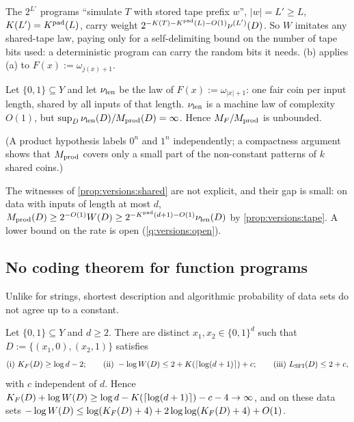The $2^{L'}$ programs ``simulate $T$ with stored tape prefix $w$'', $|w|=L'\ge L$, $K(L')=K^{\mathrm{pad}}(L)$, carry weight $2^{-K(T)-K^{\mathrm{pad}}(L)-O(1)}\nu^{(L')}(D)$. So $W$ imitates any shared-tape law, paying only for a self-delimiting bound on the number of tape bits used: a deterministic program can carry the random bits it needs. (b) applies (a) to $F(x):=\omega_{j(x)+1}$.

\begin{proposition}\label{prop:versions:shared}
Let $\{0,1\}\subseteq Y$ and let $\nu_{\mathrm{len}}$ be the law of $F(x):=\omega_{|x|+1}$: one fair coin per input length, shared by all inputs of that length. $\nu_{\mathrm{len}}$ is a machine law of complexity $O(1)$, but $\sup_D\nu_{\mathrm{len}}(D)/M_{\mathrm{prod}}(D)=\infty$. Hence $M_{F}/M_{\mathrm{prod}}$ is unbounded.
\end{proposition}

(A product hypothesis labels $0^n$ and $1^n$ independently; a compactness argument shows that $M_{\mathrm{prod}}$ covers only a small part of the non-constant patterns of $k$ shared coins.)

\begin{remark}\label{rem:versions:sharedsize}
The witnesses of \cref{prop:versions:shared} are not explicit, and their gap is small: on data with inputs of length at most $d$, $M_{\mathrm{prod}}(D)\ge2^{-O(1)}W(D)\ge2^{-K^{\mathrm{pad}}(d+1)-O(1)}\nu_{\mathrm{len}}(D)$ by \cref{prop:versions:tape}. A lower bound on the rate is open (\cref{q:versions:open}).
\end{remark}

\subsection{No coding theorem for function programs}\label{sec:versions:coding}

Unlike for strings, shortest description and algorithmic probability of data sets do not agree up to a constant.

\begin{theorem}\label{thm:versions:nocoding}
Let $\{0,1\}\subseteq Y$ and $d\ge2$. There are distinct $x_1,x_2\in\{0,1\}^d$ such that $D:=\{(x_1,0),(x_2,1)\}$ satisfies
\[
\text{(i) }K_{F}(D)\ge\log d-2;\qquad\text{(ii) }-\log W(D)\le2+K(\lceil\log(d+1)\rceil)+c;\qquad\text{(iii) }L_{\mathrm{SFI}}(D)\le2+c,
\]
with $c$ independent of $d$. Hence $K_{F}(D)+\log W(D)\ge\log d-K(\lceil\log(d+1)\rceil)-c-4\to\infty$, and on these data sets $-\log W(D)\le\log(K_{F}(D)+4)+2\log\log(K_{F}(D)+4)+O(1)$.
\end{theorem}

